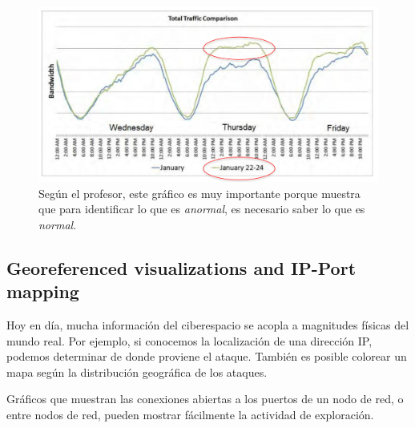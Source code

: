 \begin{figure}[htbp]
   \centering
   \includegraphics{images/03/ddos.png}
   \caption{Según el profesor, este gráfico es muy importante porque muestra que para identificar lo que es \emph{anormal}, es necesario saber lo que es \emph{normal}.}
   \label{fig:03/ddos}
\end{figure}

\subsection{Georeferenced visualizations and IP-Port mapping}
Hoy en día, mucha información del ciberespacio se acopla a magnitudes físicas del mundo real.
Por ejemplo, si conocemos la localización de una dirección IP, podemos determinar de donde proviene el ataque.
También es posible colorear un mapa según la distribución geográfica de los ataques.

Gráficos que muestran las conexiones abiertas a los puertos de un nodo de red, o entre nodos de red, pueden mostrar fácilmente la actividad de exploración.